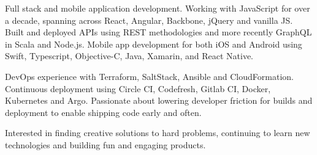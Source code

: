 
\begin{cvparagraph}
Full stack and mobile application development. Working with JavaScript for over a decade, spanning across React, Angular, Backbone, jQuery and vanilla JS. Built and deployed APIs using REST methodologies and more recently GraphQL in Scala and Node.js. Mobile app development for both iOS and Android using Swift, Typescript, Objective-C, Java, Xamarin, and React Native.

DevOps experience with Terraform, SaltStack, Ansible and CloudFormation. Continuous deployment using Circle CI, Codefresh, Gitlab CI, Docker, Kubernetes and Argo. Passionate about lowering developer friction for builds and deployment to enable shipping code early and often.

Interested in finding creative solutions to hard problems, continuing to learn new technologies and building fun and engaging products.
\end{cvparagraph}
